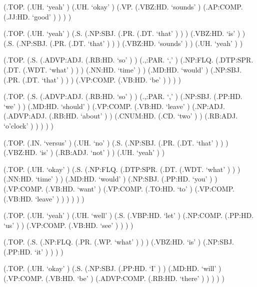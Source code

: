 \documentclass[10pt]{article}
\begin{document}
\begin{parsetree}  (.TOP. (.UH. `yeah' ) (.UH. `okay' ) (.VP. (.VBZ:HD. `sounds' ) (.AP:COMP. (.JJ:HD. `good' ) ) ) ) \end{parsetree}

\begin{parsetree}  (.TOP. (.UH. `yeah' ) (.S. (.NP:SBJ. (.PR. (.DT. `that' ) ) ) (.VBZ:HD. `is' ) ) (.S. (.NP:SBJ. (.PR. (.DT. `that' ) ) ) (.VBZ:HD. `sounds' ) ) (.UH. `yeah' ) ) \end{parsetree}

\begin{parsetree}  (.TOP. (.S. (.ADVP:ADJ. (.RB:HD. `so' ) ) (.,:PAR. `,' ) (.NP:FLQ. (.DTP:SPR. (.DT. (.WDT. `what' ) ) ) (.NN:HD. `time' ) ) (.MD:HD. `would' ) (.NP:SBJ. (.PR. (.DT. `that' ) ) ) (.VP:COMP. (.VB:HD. `be' ) ) ) ) \end{parsetree}

\begin{parsetree}  (.TOP. (.S. (.ADVP:ADJ. (.RB:HD. `so' ) ) (.,:PAR. `,' ) (.NP:SBJ. (.PP:HD. `we' ) ) (.MD:HD. `should' ) (.VP:COMP. (.VB:HD. `leave' ) (.NP:ADJ. (.ADVP:ADJ. (.RB:HD. `about' ) ) (.CNUM:HD. (.CD. `two' ) ) (.RB:ADJ. `o'clock' ) ) ) ) ) \end{parsetree}

\begin{parsetree}  (.TOP. (.IN. `versus' ) (.UH. `no' ) (.S. (.NP:SBJ. (.PR. (.DT. `that' ) ) ) (.VBZ:HD. `is' ) (.RB:ADJ. `not' ) ) (.UH. `yeah' ) ) \end{parsetree}

\begin{parsetree}  (.TOP. (.UH. `okay' ) (.S. (.NP:FLQ. (.DTP:SPR. (.DT. (.WDT. `what' ) ) ) (.NN:HD. `time' ) ) (.MD:HD. `would' ) (.NP:SBJ. (.PP:HD. `you' ) ) (.VP:COMP. (.VB:HD. `want' ) (.VP:COMP. (.TO:HD. `to' ) (.VP:COMP. (.VB:HD. `leave' ) ) ) ) ) ) \end{parsetree}

\begin{parsetree}  (.TOP. (.UH. `yeah' ) (.UH. `well' ) (.S. (.VBP:HD. `let' ) (.NP:COMP. (.PP:HD. `us' ) ) (.VP:COMP. (.VB:HD. `see' ) ) ) ) \end{parsetree}

\begin{parsetree}  (.TOP. (.S. (.NP:FLQ. (.PR. (.WP. `what' ) ) ) (.VBZ:HD. `is' ) (.NP:SBJ. (.PP:HD. `it' ) ) ) ) \end{parsetree}

\begin{parsetree}  (.TOP. (.UH. `okay' ) (.S. (.NP:SBJ. (.PP:HD. `I' ) ) (.MD:HD. `will' ) (.VP:COMP. (.VB:HD. `be' ) (.ADVP:COMP. (.RB:HD. `there' ) ) ) ) ) \end{parsetree}
\end{document}
